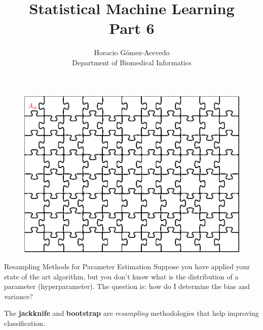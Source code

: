 \documentclass{beamer}
\title{Statistical Machine Learning\\ Part 6}
\author{Horacio G\'omez-Acevedo\\ Department of Biomedical Informatics}
\begin{document}
	\begin{frame}[plain]
		\maketitle
	\end{frame}
\begin{frame}
	\begin{figure}[h]
			\centering
			\includegraphics[scale=0.35]{../../Figures/fig_jigsaw.png}
		\end{figure}
\end{frame}

\begin{frame}{Resampling Methods for Parameter Estimation}
	Suppose you have applied your state of the art algorithm, but you don't know what is the distribution of a parameter (hyperparameter). The question is: how do I determine the bias and variance?
	
	The {\bf jackknife} and {\bf bootstrap} are {\it resampling} methodologies that help improving classification.
	
	
	 
\end{frame}
\end{document}
